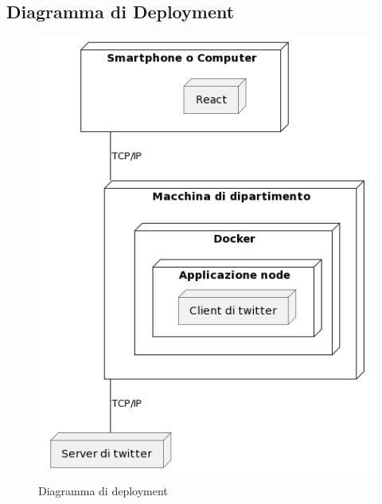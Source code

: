 \documentclass{article}
\begin{document}
\subsection{Diagramma di Deployment}
\begin{figure}[H]
    \centering
    \includegraphics[scale=0.33]{diagrammi/deployment.png}
    \caption{Diagramma di deployment}
    \label{fig:deployment}
\end{figure}
\end{document}
